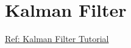 \section{Kalman Filter}
\label{sec:advanced_kalman}

\href{https://www.kalmanfilter.net/default.aspx}{Ref: Kalman Filter Tutorial}

